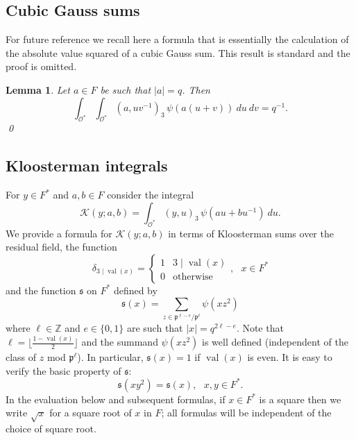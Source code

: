 \documentclass[12pt]{amsart}
\newcommand{\abs}[1]{\left|{#1}\right|}
\newcommand{\Z}{\mathbb{Z}}
\newcommand{\p}{\mathfrak{p}}
\renewcommand{\O}{\mathcal{O}}
\newcommand{\sq}{\mathfrak{s}}
\newcommand{\val}{{\operatorname{val}}}
\newcommand{\Kl}{\mathcal{K}}
\newtheorem{lemma}[theorem]{Lemma}
\theoremstyle{remark}
\begin{document}
\subsection{Cubic Gauss sums} For future reference we recall here a formula that is essentially the calculation of the absolute value squared of a cubic Gauss sum. This result is standard and the proof is omitted.
\begin{lemma}\label{lem gauss}
Let $a\in F$ be such that $\abs{a}=q$. Then
\[
\int_{\O^*}\int_{\O^*} (a,uv^{-1})_3 \,\psi(a(u+v))\ du\ dv=q^{-1}.
\]
\qed
\end{lemma}



\subsection{Kloosterman integrals}
For $y\in F^*$ and $a,b\in F$ consider the integral
\[
\Kl(y;a,b)=\int_{\O^*} (y,u)_3\,\psi(au+bu^{-1})\ du.
\]
We provide a formula for $\Kl(y;a,b)$ in terms of Kloosterman sums over the residual field, the function
\[
\delta_{3\mid \val(x)}=\begin{cases} 1 & 3\mid \val(x) \\ 0 & \text{otherwise} \end{cases}, \ \ \ x\in F^*
\] 
and the function $\sq$ on $F^*$ defined by
\[
\sq(x)=\sum_{z\in \p^{\ell-e}/\p^{\ell}} \psi(xz^2)
\]
where $\ell\in\Z$ and $e\in\{0,1\}$ are such that $\abs{x}=q^{2\ell-e}$. Note that $\ell=\lfloor \frac{1-\val(x)}2 \rfloor$ and the summand $\psi(xz^2)$ is well defined (independent of the class of $z$ mod $\p^\ell$). In particular, $\sq(x)=1$ if $\val(x)$ is even.
It is easy to verify the basic property of $\sq$:
\begin{equation}\label{eq sq pr}
\sq(xy^2)=\sq(x),\ \ \ x,y\in F^*.
\end{equation}
In the evaluation below and subsequent formulas, if $x\in F^*$ is a square then we write $\sqrt{x}$ for a square root of $x$ in $F$; all formulas will be independent of the choice of square root.
\end{document}

